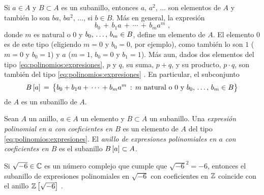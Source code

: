 \begin{obsPolinomios}\label{obs:polinomios:expresiones}
	Si $a\in A$ y $B\subset A$ es un subanillo, entonces
	$a,\,a^2,\,\dots$ son elementos de $A$ y tambi\'en lo son
	$ba,\,ba^2,\,\dots$, si $b\in B$. M\'as en general, la expresi\'on
	\begin{equation}
		\label{eq:polinomios:expresiones}
		b_0\,+\,b_1a\,+\,\cdots\,+\,b_ma^m
		\text{ ,}
	\end{equation}
	donde $m$ es natural o $0$ y $\lista[0] b{m}\in B$,
	define un elemento de $A$.
	El elemento $0$ es de este tipo (eligiendo $m=0$ y $b_0=0$,
	por ejemplo), como tambi\'en lo son $1$ ($m=0$ y $b_0=1$) y
	$a$ ($m=1$, $b_0=0$ y $b_1=1$).
	M\'as aun, dados dos elementos del tipo
	\eqref{eq:polinomios:expresiones}, $p$ y $q$, su suma, $p+q$, y su
	producto, $p\cdot q$, %
	son tambi\'en del tipo \eqref{eq:polinomios:expresiones}
	\quedacomoejercicio.
	En particular, el subconjunto
	\begin{displaymath}
		\polinomios[a] B\,=\,\big\{b_0+b_1a+\,\cdots\,+b_ma^m\,:\,
			m\text{ natural o } 0\text{ y }
			\lista[0] b{m}\in B\big\}
	\end{displaymath}
	de $A$ es un subanillo de $A$.
\end{obsPolinomios}

\begin{defPolinomios}\label{def:polinomios:expresiones}
	Sean $A$ un anillo, $a\in A$ un elemento y $B\subset A$ un subanillo.
	Una \emph{expresi\'on polinomial en $a$ con coeficientes en $B$}
	es un elemento de $A$ del tipo \eqref{eq:polinomios:expresiones}.
	El \emph{anillo de expresiones polinomiales en $a$ con coeficientes %
	en $B$} es el subanillo $\polinomios[a] B\subset A$.
\end{defPolinomios}

\begin{ejemPolinomios}\label{ejem:polinomios:expresiones}
	Si $\sqrt{-6}\in\Complejos$ es un n\'umero complejo que cumple que
	$\sqrt{-6}^2=-6$, entonces el subanillo de expresiones polinomiales
	en $\sqrt{-6}$ con coeficientes en $\Enteros$ coincide con el
	anillo $\polinomios[\sqrt{-6}] \Enteros$
	\quedacomoejercicio.
\end{ejemPolinomios}

